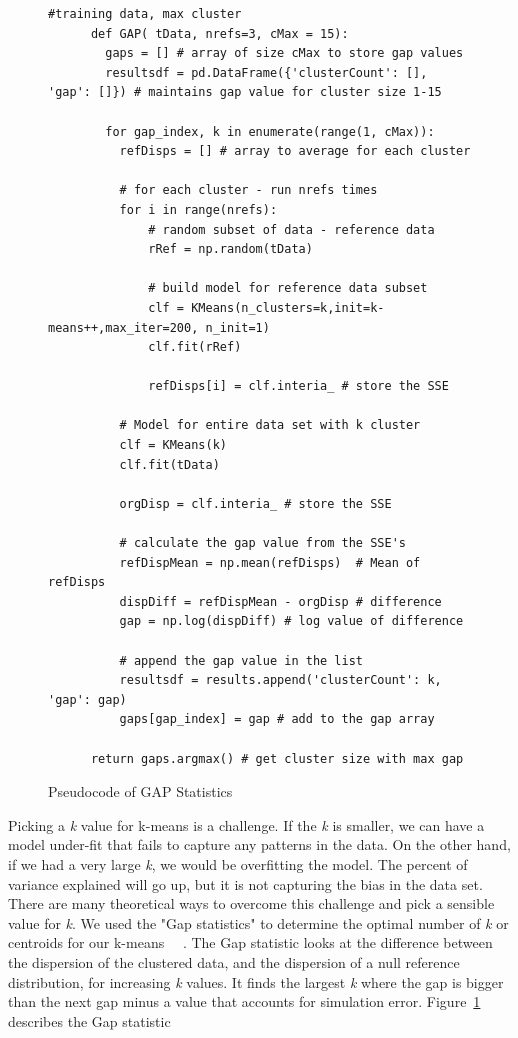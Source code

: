\documentclass[sigconf]{acmart}
\theoremstyle{break}
\begin{document}
    \begin{figure}[!t]
    \small
     \begin{lstlisting}[mathescape,linewidth=7.5cm,frame=none,numbers=right]
      #training data, max cluster
      def GAP( tData, nrefs=3, cMax = 15): 
        gaps = [] # array of size cMax to store gap values
        resultsdf = pd.DataFrame({'clusterCount': [], 'gap': []}) # maintains gap value for cluster size 1-15
        
        for gap_index, k in enumerate(range(1, cMax)):
          refDisps = [] # array to average for each cluster
           
          # for each cluster - run nrefs times
          for i in range(nrefs):
              # random subset of data - reference data
              rRef = np.random(tData)  
                
              # build model for reference data subset
              clf = KMeans(n_clusters=k,init=k-means++,max_iter=200, n_init=1)
              clf.fit(rRef)
              
              refDisps[i] = clf.interia_ # store the SSE
           
          # Model for entire data set with k cluster
          clf = KMeans(k)
          clf.fit(tData)
          
          orgDisp = clf.interia_ # store the SSE
          
          # calculate the gap value from the SSE's
          refDispMean = np.mean(refDisps)  # Mean of refDisps
          dispDiff = refDispMean - orgDisp # difference
          gap = np.log(dispDiff) # log value of difference
          
          # append the gap value in the list 
          resultsdf = results.append('clusterCount': k, 'gap': gap) 
          gaps[gap_index] = gap # add to the gap array
       
      return gaps.argmax() # get cluster size with max gap
            \end{lstlisting} 
            \vspace{-0.2cm}
            \caption{Pseudocode of GAP Statistics}
            \label{fig:GAP_pseudocode} 
            \vspace{-0.3cm}
    \end{figure}
    Picking a {\em k} value for k-means is a challenge. If the {\em k} is smaller, we can have a model under-fit that fails to capture any patterns in the data. On the other hand, if we had a very large {\em k}, we would be overfitting the model. The percent of variance explained will go up, but it is not capturing the bias in the data set. There are many theoretical ways to overcome this challenge and pick a sensible value for {\em k}. We used the "Gap statistics" to determine the optimal number of {\em k} or centroids for our k-means ~\cite{mohajer2011comparison}~\cite{tibshirani2001estimating}. The Gap statistic looks at the difference between the dispersion of the clustered data, and the dispersion of a null reference distribution, for increasing {\em k} values. It finds the largest {\em k} where the gap is bigger than the next gap minus a value that accounts for simulation error.   Figure~\ref{fig:GAP_pseudocode} describes the Gap statistic
\end{document}

